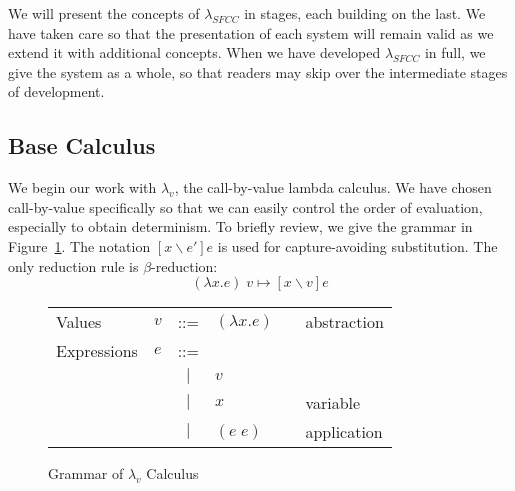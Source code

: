 \documentclass[11pt]{article}
\newcommand\x{\lambda x}
\begin{document}
We will present the concepts of $\lambda_{SFCC}$ in stages, each building on the last.
We have taken care so that the presentation of each system will remain valid as we extend it with additional concepts.
When we have developed $\lambda_{SFCC}$ in full, we give the system as a whole, so that readers may skip over the intermediate stages of development.

\subsection{Base Calculus}

We begin our work with $\lambda_v$, the call-by-value lambda calculus.
We have chosen call-by-value specifically so that we can easily control the order of evaluation, especially to obtain determinism.
To briefly review, we give the grammar in Figure~\ref{fig:lambdaCalculus}.
The notation $[x \backslash e']e$ is used for capture-avoiding substitution.
The only reduction rule is $\beta$-reduction:
$$(\x.e)\;v \mapsto [x \backslash v]e$$

\begin{figure}[H]
\caption{Grammar of $\lambda_v$ Calculus}
\label{fig:lambdaCalculus}

\begin{tabular}{llclll}
Values & $v$ & ::= & $(\lambda x.e)$ && abstraction\\
Expressions & $e$ & ::= & \\
& & $|$ & $v$ && \\
& & $|$ & $x$ && variable \\
& & $|$ & $(e\;e)$ && application \\
\end{tabular}
\end{figure}
\end{document}
